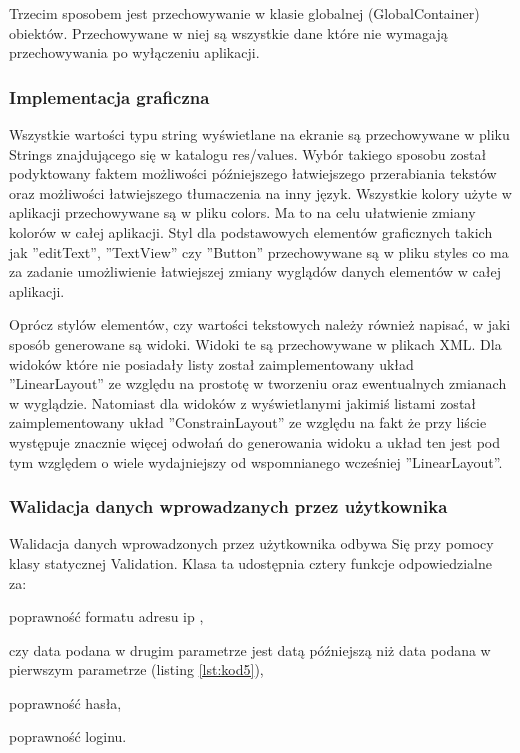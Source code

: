 	Trzecim sposobem jest przechowywanie w klasie globalnej (GlobalContainer)  obiektów. Przechowywane w niej są wszystkie dane które nie wymagają przechowywania po wyłączeniu aplikacji.
		
	\subsubsection{Implementacja graficzna}
		
	Wszystkie wartości typu string wyświetlane na ekranie są przechowywane w pliku Strings znajdującego się w katalogu res/values. Wybór takiego sposobu został podyktowany faktem możliwości późniejszego łatwiejszego przerabiania tekstów oraz możliwości łatwiejszego tłumaczenia na inny język. Wszystkie kolory użyte w aplikacji przechowywane są w pliku colors. Ma to na celu ułatwienie  zmiany kolorów w całej aplikacji. Styl dla podstawowych elementów graficznych takich jak ''editText'', ''TextView'' czy ''Button'' przechowywane są w pliku styles co ma za zadanie umożliwienie łatwiejszej zmiany wyglądów danych elementów w całej aplikacji.
		
	Oprócz stylów elementów, czy wartości tekstowych należy również napisać, w jaki sposób generowane są widoki. Widoki te są przechowywane w plikach XML.  Dla widoków które nie posiadały listy został zaimplementowany układ ''LinearLayout'' ze względu na prostotę w tworzeniu oraz ewentualnych zmianach w wyglądzie. Natomiast dla widoków z wyświetlanymi jakimiś listami został zaimplementowany układ ''ConstrainLayout'' ze względu na fakt że przy liście występuje znacznie więcej odwołań do generowania widoku a układ ten jest pod tym względem o wiele wydajniejszy od wspomnianego wcześniej ''LinearLayout''. 
		
	\newpage
	\subsubsection{Walidacja danych wprowadzanych przez użytkownika}
	Walidacja danych wprowadzonych przez użytkownika odbywa Się przy pomocy klasy statycznej Validation. Klasa ta udostępnia cztery funkcje odpowiedzialne za:
	\begin{itemize*}
	\item poprawność formatu adresu ip ,
	\item czy data podana w drugim parametrze jest datą późniejszą niż data podana w pierwszym parametrze (listing \ref{lst:kod5}),
	\item poprawność hasła,
	\item poprawność loginu.
	\end{itemize*}

